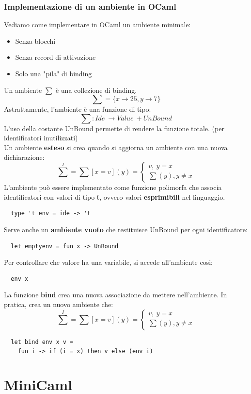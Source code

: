 \documentclass[12pt,a4paper]{article}
\let\oldsection\section
\renewcommand{\section}{\clearpage\oldsection}
\begin{document}
\subsubsection{Implementazione di un ambiente in OCaml}
Vediamo come implementare in OCaml un ambiente minimale:
\begin{itemize}
  \item Senza blocchi
  \item Senza record di attivazione
  \item Solo una "pila" di binding
\end{itemize}
Un ambiente $\sum$ è una collezione di binding.
\[
\sum = \{x \rightarrow 25, y \rightarrow 7\}
\]
Astrattamente, l'ambiente è una funzione di tipo:
\[
\sum: Ide\ \rightarrow Value\ + UnBound
\]
L'uso della costante UnBound permette di rendere la funzione totale. (per identificatori inutilizzati)\\
Un ambiente \textbf{esteso} si crea quando si aggiorna un ambiente con una nuova dichiarazione:
\[
\sum^I = \sum[x=v](y) = \begin{cases}
  v,\ y = x\\
  \sum(y), y \ne x
\end{cases}
\]
L'ambiente può essere implementato come funzione polimorfa che associa identificatori con valori di tipo \'t, ovvero valori \textbf{esprimibili} nel linguaggio.
\begin{lstlisting}
  type 't env = ide -> 't
\end{lstlisting}
Serve anche un \textbf{ambiente vuoto} che restituisce UnBound per ogni identificatore:
\begin{lstlisting}
  let emptyenv = fun x -> UnBound
\end{lstlisting}
Per controllare che valore ha una variabile, si accede all'ambiente cosi:
\begin{lstlisting}
  env x
\end{lstlisting}
La funzione \textbf{bind} crea una nuova associazione da mettere nell'ambiente. In pratica, crea un nuovo ambiente che:
\[
\sum^I = \sum[x=v](y) = \begin{cases}
  v,\ y = x\\
  \sum(y), y \ne x
\end{cases}
\]
\begin{lstlisting}
  let bind env x v = 
    fun i -> if (i = x) then v else (env i)
\end{lstlisting}

\section{MiniCaml}
\end{document}
